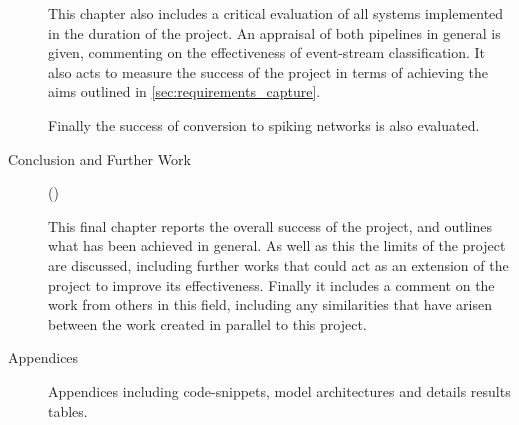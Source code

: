 \begin{description}
      This chapter also includes a critical evaluation of all systems implemented in the duration of the project. An appraisal of both pipelines in general is given, commenting on the effectiveness of event-stream classification. It also acts to measure the success of the project in terms of achieving the aims outlined in \cref{sec:requirements_capture}.

      Finally the success of conversion to spiking networks is also evaluated.
      
      \item[Conclusion and Further Work] ()
      
      This final chapter reports the overall success of the project, and outlines what has been achieved in general. As well as this the limits of the project are discussed, including further works that could act as an extension of the project to improve its effectiveness. Finally it includes a comment on the work from others in this field, including any similarities that have arisen between the work created in parallel to this project.
      
      \item[Appendices]
      Appendices including code-snippets, model architectures and details results tables.
\end{description}